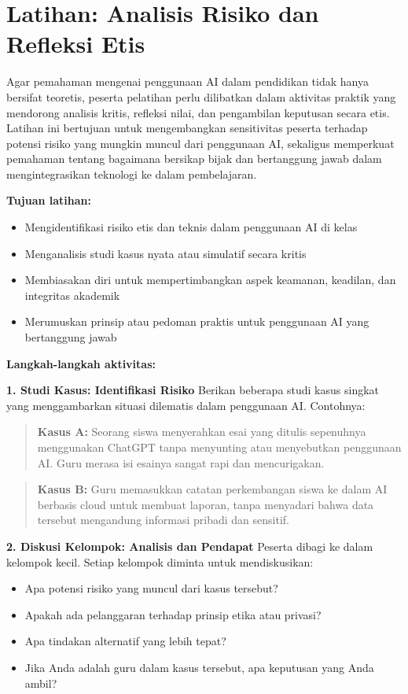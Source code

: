 \section{Latihan: Analisis Risiko dan Refleksi Etis}

Agar pemahaman mengenai penggunaan AI dalam pendidikan tidak hanya bersifat teoretis, peserta pelatihan perlu dilibatkan dalam aktivitas praktik yang mendorong analisis kritis, refleksi nilai, dan pengambilan keputusan secara etis. Latihan ini bertujuan untuk mengembangkan sensitivitas peserta terhadap potensi risiko yang mungkin muncul dari penggunaan AI, sekaligus memperkuat pemahaman tentang bagaimana bersikap bijak dan bertanggung jawab dalam mengintegrasikan teknologi ke dalam pembelajaran.

\textbf{Tujuan latihan:}
\begin{itemize}
	\item Mengidentifikasi risiko etis dan teknis dalam penggunaan AI di kelas
	\item Menganalisis studi kasus nyata atau simulatif secara kritis
	\item Membiasakan diri untuk mempertimbangkan aspek keamanan, keadilan, dan integritas akademik
	\item Merumuskan prinsip atau pedoman praktis untuk penggunaan AI yang bertanggung jawab
\end{itemize}

\textbf{Langkah-langkah aktivitas:}

\textbf{1. Studi Kasus: Identifikasi Risiko}
Berikan beberapa studi kasus singkat yang menggambarkan situasi dilematis dalam penggunaan AI. Contohnya:

\begin{quote}
	\textbf{Kasus A:} Seorang siswa menyerahkan esai yang ditulis sepenuhnya menggunakan ChatGPT tanpa menyunting atau menyebutkan penggunaan AI. Guru merasa isi esainya sangat rapi dan mencurigakan.
\end{quote}

\begin{quote}
	\textbf{Kasus B:} Guru memasukkan catatan perkembangan siswa ke dalam AI berbasis cloud untuk membuat laporan, tanpa menyadari bahwa data tersebut mengandung informasi pribadi dan sensitif.
\end{quote}

\textbf{2. Diskusi Kelompok: Analisis dan Pendapat}
Peserta dibagi ke dalam kelompok kecil. Setiap kelompok diminta untuk mendiskusikan:
\begin{itemize}
	\item Apa potensi risiko yang muncul dari kasus tersebut?
	\item Apakah ada pelanggaran terhadap prinsip etika atau privasi?
	\item Apa tindakan alternatif yang lebih tepat?
	\item Jika Anda adalah guru dalam kasus tersebut, apa keputusan yang Anda ambil?
\end{itemize}

